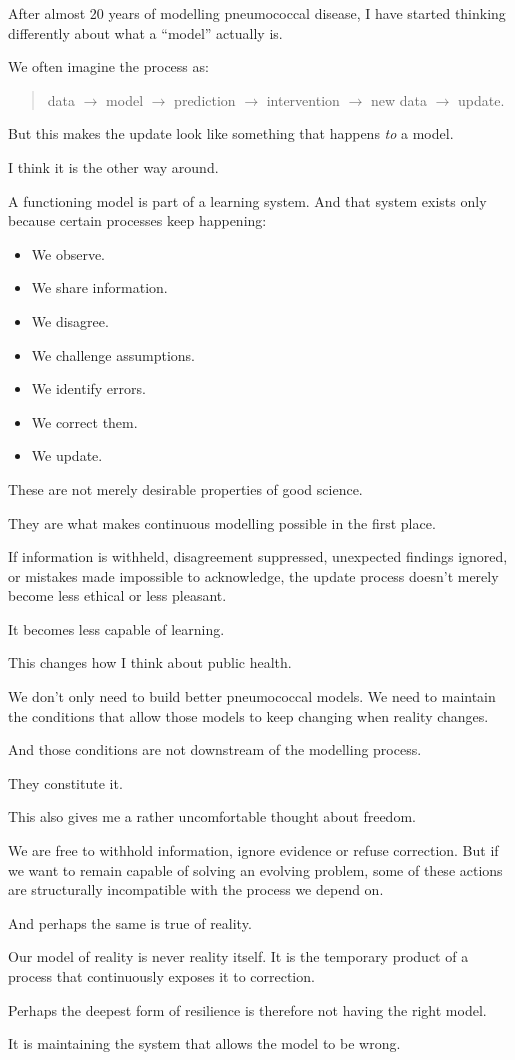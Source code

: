 \documentclass{article}
\begin{document}
After almost 20 years of modelling pneumococcal disease, I have started thinking differently about what a ``model'' actually is.

We often imagine the process as:

\begin{quote}
data $\rightarrow$ model $\rightarrow$ prediction $\rightarrow$ intervention $\rightarrow$ new data $\rightarrow$ update.
\end{quote}

But this makes the update look like something that happens \emph{to} a model.

I think it is the other way around.

A functioning model is part of a learning system. And that system exists only because certain processes keep happening:

\begin{itemize}
    \item We observe.
    \item We share information.
    \item We disagree.
    \item We challenge assumptions.
    \item We identify errors.
    \item We correct them.
    \item We update.
\end{itemize}

These are not merely desirable properties of good science.

They are what makes continuous modelling possible in the first place.

If information is withheld, disagreement suppressed, unexpected findings ignored, or mistakes made impossible to acknowledge, the update process doesn't merely become less ethical or less pleasant.

It becomes less capable of learning.

This changes how I think about public health.

We don't only need to build better pneumococcal models. We need to maintain the conditions that allow those models to keep changing when reality changes.

And those conditions are not downstream of the modelling process.

They constitute it.

This also gives me a rather uncomfortable thought about freedom.

We are free to withhold information, ignore evidence or refuse correction. But if we want to remain capable of solving an evolving problem, some of these actions are structurally incompatible with the process we depend on.

And perhaps the same is true of reality.

Our model of reality is never reality itself. It is the temporary product of a process that continuously exposes it to correction.

Perhaps the deepest form of resilience is therefore not having the right model.

It is maintaining the system that allows the model to be wrong.
\end{document}
